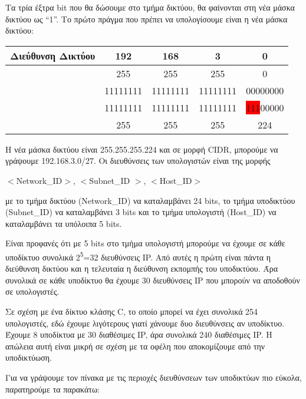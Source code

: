 Τα τρία έξτρα bit που θα δώσουμε στο τμήμα δικτύου, θα φαίνονται στη νέα μάσκα δικτύου ως ``1''. Το πρώτο πράγμα που πρέπει να υπολογίσουμε είναι η νέα μάσκα δικτύου:

\begin{center}
\fontsize{11}{13}
\ttfamily
\begin{tabular}{|c|c|c|c|c|}
\hline
 \textbf{Διεύθυνση Δικτύου} & 192 & 168 & 3 & 0 \\ 
\hline
\multirow{2}{*}{} \textbf{Παλιά Μάσκα} & 255 & 255 & 255  & 0 \\ 
\cline{2-5} 
              \textbf{Δικτύου} & 11111111  & 11111111 & 11111111 & 00000000 \\ 
\hline
\multirow{2}{*}{} \textbf{Νέα Μάσκα} & 11111111 & 11111111 & 11111111 & \colorbox{red}{111}00000  \\ 
\cline{2-5} 
             \textbf{Υποδικτύου} & 255 & 255 & 255 & 224 \\ 
\hline
\end{tabular}
\normalfont
\end{center}

Η νέα μάσκα δικτύου είναι 255.255.255.224 και σε μορφή CIDR, μπορούμε να γράψουμε 192.168.3.0/27. Οι διευθύνσεις των υπολογιστών είναι της μορφής

$<$Network\_ID$>$, $<$Subnet\_ID $>$, $<$Host\_ID$>$

με το τμήμα δικτύου (Network\_ID) να καταλαμβάνει 24 bits, το τμήμα υποδικτύου (Subnet\_ID) να καταλαμβάνει 3 bits και το τμήμα υπολογιστή (Host\_ID) να καταλαμβάνει τα υπόλοιπα 5 bits.

Είναι προφανές ότι με 5 bits στο τμήμα υπολογιστή μπορούμε να έχουμε σε κάθε υποδίκτυο συνολικά 2\textsuperscript{5}=32 διευθύνσεις IP. Από αυτές η πρώτη είναι πάντα η διεύθυνση δικτύου και η τελευταία η διεύθυνση εκπομπής του υποδικτύου. Άρα συνολικά σε κάθε υποδίκτυο θα έχουμε 30 διευθύνσεις IP που μπορούν να αποδοθούν σε υπολογιστές.

Σε σχέση με ένα δίκτυο κλάσης C, το οποίο μπορεί να έχει συνολικά 254 υπολογιστές, εδώ έχουμε λιγότερους γιατί χάνουμε δυο διευθύνσεις αν υποδίκτυο. Έχουμε 8 υποδίκτυα με 30 διαθέσιμες IP, άρα συνολικά 240 διαθέσιμες IP. Η απώλεια αυτή είναι μικρή σε σχέση με τα οφέλη που αποκομίζουμε από την υποδικτύωση.

Για να γράψουμε τον πίνακα με τις περιοχές διευθύνσεων των υποδικτύων πιο εύκολα, παρατηρούμε τα παρακάτω:

